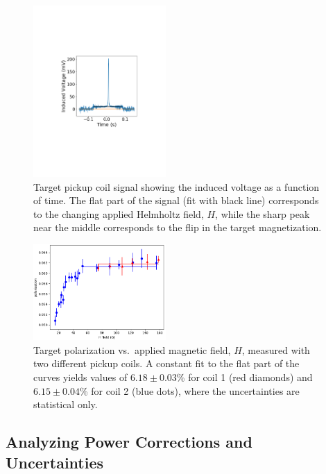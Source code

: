 \begin{figure}[ht]
 \begin{center}
  \includegraphics[width=0.45\textwidth]{11Vtgtdata.pdf}
 \end{center}
 \caption{Target pickup coil signal showing the induced voltage as a function of time.  The flat part of the signal
   (fit with black line) corresponds to the changing applied Helmholtz field, $H$, while the sharp peak near the
   middle corresponds to the flip in the target magnetization.}
 \label{fig-TPolMeas}
\end{figure}

\begin{figure}[ht]
 \begin{center}
  \includegraphics[width=0.45\textwidth]{PvsH0.png}
 \end{center}
 \caption{Target polarization vs.~applied magnetic field, $H$, measured with two different pickup coils. A
   constant fit to the flat part of the curves yields values of $6.18\pm 0.03$\% for coil 1 (red diamonds) and
   $6.15\pm 0.04$\% for coil 2 (blue dots), where the uncertainties are statistical only.} 
 \label{fig-PSat}
\end{figure}

\subsection{Analyzing Power Corrections and Uncertainties}
\label{sec-PolCor}

